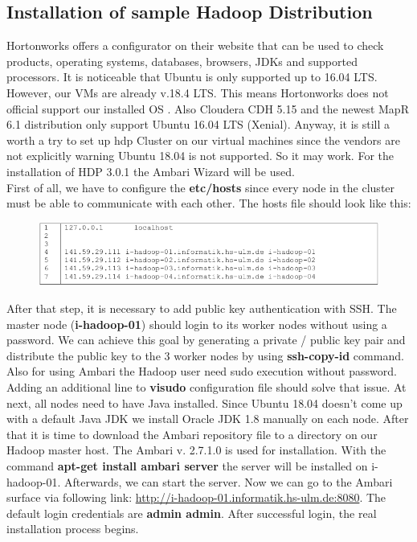 \documentclass[12pt]{article}
\begin{document}
\subsection{Installation of sample Hadoop Distribution}\label{intallhadoop}
Hortonworks offers a configurator on their website that can be used to check products, operating systems,
databases, browsers, JDKs and supported processors. It is noticeable that Ubuntu is only supported up to
16.04 LTS. However, our VMs are already v.18.4 LTS. This means Hortonworks does not official support
our installed OS \citep{Hortonworks2018a}. Also Cloudera CDH 5.15 \citep{Cloudera2018b} and the newest MapR 6.1 distribution \cite{MapR2018} only support Ubuntu 16.04 LTS (Xenial). Anyway, it is still a worth a try to set up \acs{hdp} Cluster on our virtual machines since the vendors are not explicitly warning Ubuntu 18.04 is not supported. So it may work. For the installation of HDP 3.0.1 the Ambari Wizard \citep{Hortonworks2018} will be used.\\First of all, we have to configure the \textbf{etc/hosts} since every node in the cluster must be able to communicate with each other. The hosts file should look like this:
\begin{figure}[H]
\hspace{-1.3cm}
\includegraphics[width=1.2\textwidth]{img/etchost}
\label{pic:etchost}
\end{figure}
\noindent After that step, it is necessary to add public key authentication with SSH. The master node (\textbf{i-hadoop-01}) should login to its worker nodes without using a password. We can achieve this goal by generating a private / public key pair and distribute the public key to the 3 worker nodes by using \textbf{ssh-copy-id} command. Also for using Ambari the Hadoop user need sudo execution without password. Adding an additional line to \textbf{visudo} configuration file should solve that issue. At next, all nodes need to have Java installed. Since Ubuntu 18.04 doesn’t come up with a default Java JDK
we install Oracle JDK 1.8 manually on each node. After that it is time to download the Ambari repository
file to a directory on our Hadoop master host. The Ambari v. 2.7.1.0 is used for installation. With the command \textbf{apt-get install ambari server} the server will be installed on i-hadoop-01. Afterwards, we can start the server. Now we can go to the Ambari surface via following link: \href{http://i-hadoop-01.informatik.hs-ulm.de:8080}{http://i-hadoop-01.informatik.hs-ulm.de:8080}. The default login credentials are \textbf{admin admin}. After successful login, the real installation process begins.
\end{document}
